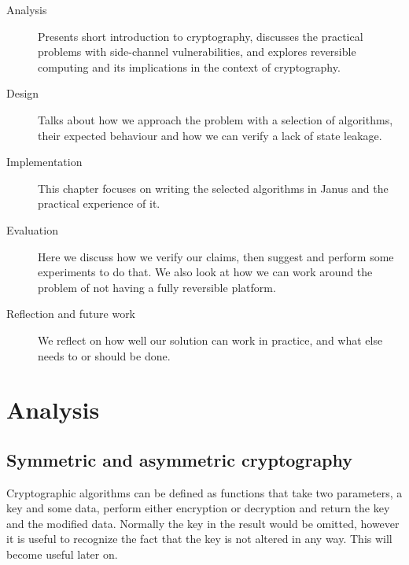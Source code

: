 \documentclass[a4paper,10pt,openright]{memoir}
\begin{document}
\begin{description}

\item[Analysis] Presents short introduction to cryptography, discusses 
the practical problems with side-channel vulnerabilities, and explores 
reversible computing and its implications in the context of 
cryptography.

\item[Design] Talks about how we approach the problem with a selection 
of algorithms, their expected behaviour and how we can verify a lack of 
state leakage.

\item[Implementation] This chapter focuses on writing the selected 
algorithms in Janus and the practical experience of it.

\item[Evaluation] Here we discuss how we verify our claims, then 
suggest and perform some experiments to do that. We also look at how we 
can work around the problem of not having a fully reversible platform. 

\item[Reflection and future work] We reflect on how well our solution 
can work in practice, and what else needs to or should be done. 

\end{description}

\chapter{Analysis}


\section{Symmetric and asymmetric cryptography}

Cryptographic algorithms can be defined as functions that take two 
parameters, a key and some data, perform either encryption or 
decryption and return the key and the modified data. Normally the key 
in the result would be omitted, however it is useful to recognize the 
fact that the key is not altered in any way. This will become useful 
later on.
\end{document}
